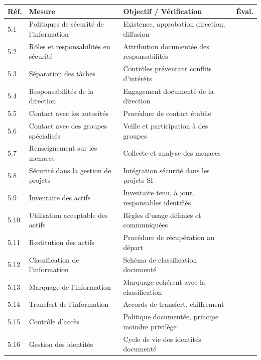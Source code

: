 \documentclass[12pt,a4paper,oneside]{report}
\begin{document}
\begin{longtable}{|p{1.5cm}|p{6.5cm}|p{4.5cm}|p{1cm}|}
\hline
\rowcolor{theadcolor}
\color{white}\textbf{Réf.} &
\color{white}\textbf{Mesure} &
\color{white}\textbf{Objectif / Vérification} &
\color{white}\textbf{Éval.} \\
\hline\endhead\hline\endfoot
\rowcolor{trow1}
5.1 & Politiques de sécurité de l'information &
  Existence, approbation direction, diffusion & \\
\hline\rowcolor{trow2}
5.2 & Rôles et responsabilités en sécurité &
  Attribution documentée des responsabilités & \\
\hline\rowcolor{trow1}
5.3 & Séparation des tâches &
  Contrôles préventant conflits d'intérêts & \\
\hline\rowcolor{trow2}
5.4 & Responsabilités de la direction &
  Engagement documenté de la direction & \\
\hline\rowcolor{trow1}
5.5 & Contact avec les autorités &
  Procédure de contact établie & \\
\hline\rowcolor{trow2}
5.6 & Contact avec des groupes spécialisés &
  Veille et participation à des groupes & \\
\hline\rowcolor{trow1}
5.7 & Renseignement sur les menaces &
  Collecte et analyse des menaces & \\
\hline\rowcolor{trow2}
5.8 & Sécurité dans la gestion de projets &
  Intégration sécurité dans les projets SI & \\
\hline\rowcolor{trow1}
5.9 & Inventaire des actifs &
  Inventaire tenu, à jour, responsables identifiés & \\
\hline\rowcolor{trow2}
5.10 & Utilisation acceptable des actifs &
  Règles d'usage définies et communiquées & \\
\hline\rowcolor{trow1}
5.11 & Restitution des actifs &
  Procédure de récupération au départ & \\
\hline\rowcolor{trow2}
5.12 & Classification de l'information &
  Schéma de classification documenté & \\
\hline\rowcolor{trow1}
5.13 & Marquage de l'information &
  Marquage cohérent avec la classification & \\
\hline\rowcolor{trow2}
5.14 & Transfert de l'information &
  Accords de transfert, chiffrement & \\
\hline\rowcolor{trow1}
5.15 & Contrôle d'accès &
  Politique documentée, principe moindre privilège & \\
\hline\rowcolor{trow2}
5.16 & Gestion des identités &
  Cycle de vie des identités documenté & \\

\end{longtable}
\end{document}
